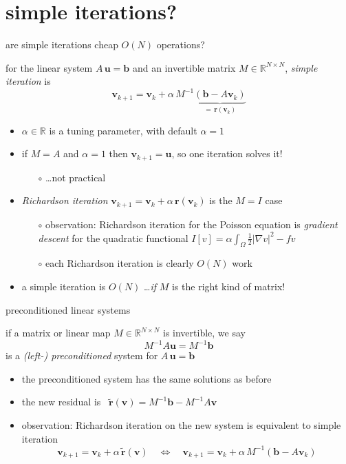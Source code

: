 \documentclass[10pt,
               svgnames,
               hyperref={colorlinks,citecolor=DeepPink4,linkcolor=FireBrick,urlcolor=Maroon},
               usepdftitle=false]{beamer}
\newcommand{\bb}{\mathbf{b}}
\newcommand{\br}{\mathbf{r}}
\newcommand{\bu}{\mathbf{u}}
\newcommand{\bv}{\mathbf{v}}
\newcommand{\RR}{\mathbb{R}}
\newcommand{\grad}{\nabla}
\begin{document}
\section{simple iterations?}

\begin{frame}{are simple iterations cheap $O(N)$ operations?}

\begin{definition} for the linear system $A\,\bu=\bb$ and an invertible matrix $M\in \RR^{N\times N}$, \emph{simple iteration} is
    $$\bv_{k+1} = \bv_k + \alpha\, M^{-1} \underbrace{\left(\bb - A \bv_k\right)}_{=\,\br(\bv_k)}$$
\end{definition}

\begin{itemize}
\item $\alpha\in\RR$ is a tuning parameter, with default $\alpha=1$
\item if $M=A$ and $\alpha=1$ then $\bv_{k+1}=\bu$, so one iteration solves it!
	\begin{itemize}
	\item[$\circ$] \dots not practical
	\end{itemize}
\item \emph{Richardson iteration} \quad $\bv_{k+1} = \bv_k + \alpha\, \br(\bv_k)$ \quad is the $M=I$ case
	\begin{itemize}
	\item[$\circ$] observation: Richardson iteration for the Poisson equation is \emph{gradient descent} for the quadratic functional \quad $\displaystyle I[v] = \alpha \int_\Omega \frac{1}{2} |\grad v|^2 - f v$
	\item[$\circ$] each Richardson iteration is clearly $O(N)$ work
	\end{itemize}

\medskip
\item a simple iteration is $O(N)$ \dots \emph{if} $M$ is the right kind of matrix!
\end{itemize}
\end{frame}


\begin{frame}{preconditioned linear systems}

\begin{definition} if a matrix or linear map $M \in \RR^{N\times N}$ is invertible, we say
    $$M^{-1} A \bu = M^{-1} \bb$$
is a \emph{(left-) preconditioned} system for $A\,\bu=\bb$
\end{definition}

\begin{itemize}
\item the preconditioned system has the same solutions as before
\item the new residual is \, $\tilde{\br}(\bv) = M^{-1} \bb - M^{-1} A \bv$
\item observation: Richardson iteration on the new system is equivalent to simple iteration
    $$\bv_{k+1} = \bv_k + \alpha\, \tilde{\br}(\bv) \quad \iff \quad \bv_{k+1} = \bv_k + \alpha\, M^{-1} \left(\bb - A \bv_k\right)$$
\end{itemize}
\end{frame}
\end{document}
